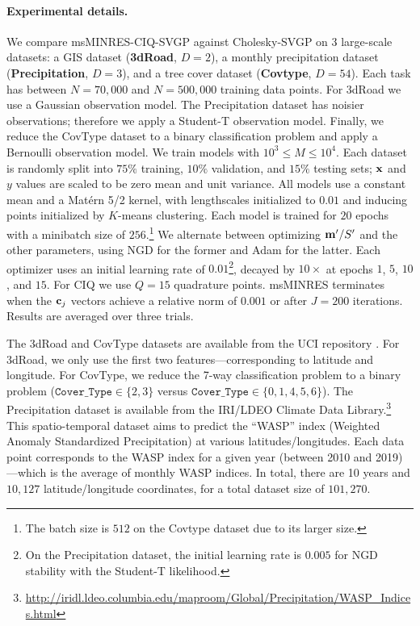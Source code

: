 \paragraph{Experimental details.}
We compare msMINRES-CIQ-SVGP against Cholesky-SVGP on 3 large-scale datasets: a GIS dataset ({\bf 3dRoad}, $D=2$), a monthly precipitation dataset ({\bf Precipitation}, $D=3$), and a tree cover dataset ({\bf Covtype}, $D=54$).
Each task has between $N=70,\!000$ and $N=500,\!000$ training data points.
For 3dRoad we use a Gaussian observation model.
The Precipitation dataset has noisier observations; therefore we apply a Student-T observation model.
Finally, we reduce the CovType dataset to a binary classification problem and apply a Bernoulli observation model.
We train models with $ 10^3 \le M \le 10^4$.
Each dataset is randomly split into $75\%$ training, $10\%$ validation, and $15\%$ testing sets; $\mathbf{x}$ and $y$ values are scaled to be zero mean and unit variance.
All models use a constant mean and a Mat\'ern 5/2 kernel, with lengthscales initialized to $0.01$ and inducing points initialized by $K$-means clustering.
Each model is trained for $20$ epochs with a minibatch size of $256.$\footnote{
  The batch size is $512$ on the Covtype dataset due to its larger size.
}
We alternate between optimizing $\mathbf{m}'/S'$ and the other parameters, using NGD for the former and Adam \cite{kingma2014adam} for the latter.
Each optimizer uses an initial learning rate of $0.01$\footnote{
  On the Precipitation dataset, the initial learning rate is $0.005$ for NGD stability with the Student-T likelihood.
}, decayed by $10\times$ at epochs $1$, $5$, $10$, and $15$.
For CIQ we use $Q = 15$ quadrature points.
msMINRES terminates when the $\mathbf{c}_j$ vectors achieve a relative norm of $0.001$ or after $J=200$ iterations.
Results are averaged over three trials.

The 3dRoad and CovType datasets are available from the UCI repository \citep{asuncion2007uci}.
For 3dRoad, we only use the first two features---corresponding to latitude and longitude.
For CovType, we reduce the 7-way classification problem to a binary problem ($\mathtt{Cover\_Type} \in \{ 2, 3\}$ versus $\mathtt{Cover\_Type} \in \{ 0, 1, 4, 5, 6 \}$).
The Precipitation dataset is available from the IRI/LDEO Climate Data Library.\footnote{
  \url{http://iridl.ldeo.columbia.edu/maproom/Global/Precipitation/WASP_Indices.html}
}
This spatio-temporal dataset aims to predict the ``WASP'' index (Weighted Anomaly Standardized Precipitation) at various latitudes/longitudes.
Each data point corresponds to the WASP index for a given year (between 2010 and 2019)---which is the average of monthly WASP indices.
In total, there are 10 years and $10,\!127$ latitude/longitude coordinates, for a total dataset size of $101,\!270$.

